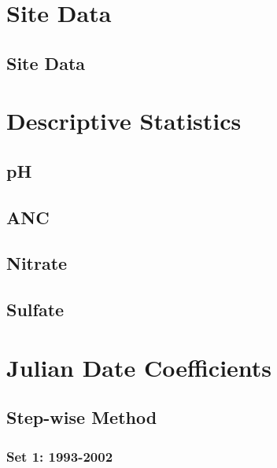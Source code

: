 \chapter{Site Data}\pagebreak

	\section{Site Data}
		\pagebreak

		\pagebreak


\chapter{Descriptive Statistics}\label{sec:DescriptiveStats}\pagebreak
	
	\section{pH}
		\pagebreak

	\section{ANC}
		\pagebreak

	\section{Nitrate}
		\pagebreak

	\section{Sulfate}
		\pagebreak

\chapter{Julian Date Coefficients}\pagebreak

	\section{Step-wise Method}\label{sec:SWJD}

		\subsection{Set 1: 1993-2002}
		 \pagebreak

